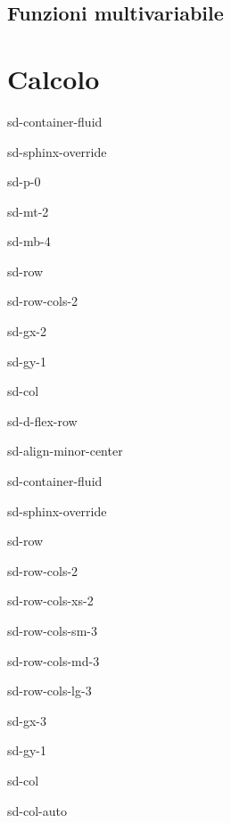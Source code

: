 \documentclass[letterpaper,10pt,english]{jupyterBook}
\begin{document}
\chapter{Funzioni multi\sphinxhyphen{}variabile}
\label{\detokenize{ch/precalculus/multivariable-real-fun:funzioni-multi-variabile}}\label{\detokenize{ch/precalculus/multivariable-real-fun:math-hs-precalculus-multivariable-real-fun}}\label{\detokenize{ch/precalculus/multivariable-real-fun::doc}}
\sphinxstepscope


\part{Calcolo}

\sphinxstepscope

\begin{sphinxuseclass}{sd-container-fluid}
\begin{sphinxuseclass}{sd-sphinx-override}
\begin{sphinxuseclass}{sd-p-0}
\begin{sphinxuseclass}{sd-mt-2}
\begin{sphinxuseclass}{sd-mb-4}
\begin{sphinxuseclass}{sd-row}
\begin{sphinxuseclass}{sd-row-cols-2}
\begin{sphinxuseclass}{sd-gx-2}
\begin{sphinxuseclass}{sd-gy-1}
\begin{sphinxuseclass}{sd-col}
\begin{sphinxuseclass}{sd-d-flex-row}
\begin{sphinxuseclass}{sd-align-minor-center}
\begin{sphinxuseclass}{sd-container-fluid}
\begin{sphinxuseclass}{sd-sphinx-override}
\begin{sphinxuseclass}{sd-row}
\begin{sphinxuseclass}{sd-row-cols-2}
\begin{sphinxuseclass}{sd-row-cols-xs-2}
\begin{sphinxuseclass}{sd-row-cols-sm-3}
\begin{sphinxuseclass}{sd-row-cols-md-3}
\begin{sphinxuseclass}{sd-row-cols-lg-3}
\begin{sphinxuseclass}{sd-gx-3}
\begin{sphinxuseclass}{sd-gy-1}
\begin{sphinxuseclass}{sd-col}
\begin{sphinxuseclass}{sd-col-auto}

\end{sphinxuseclass}
\end{sphinxuseclass}
\end{sphinxuseclass}
\end{sphinxuseclass}
\end{sphinxuseclass}
\end{sphinxuseclass}
\end{sphinxuseclass}
\end{sphinxuseclass}
\end{sphinxuseclass}
\end{sphinxuseclass}
\end{sphinxuseclass}
\end{sphinxuseclass}
\end{sphinxuseclass}
\end{sphinxuseclass}
\end{sphinxuseclass}
\end{sphinxuseclass}
\end{sphinxuseclass}
\end{sphinxuseclass}
\end{sphinxuseclass}
\end{sphinxuseclass}
\end{sphinxuseclass}
\end{sphinxuseclass}
\end{sphinxuseclass}
\end{sphinxuseclass}
\end{document}
